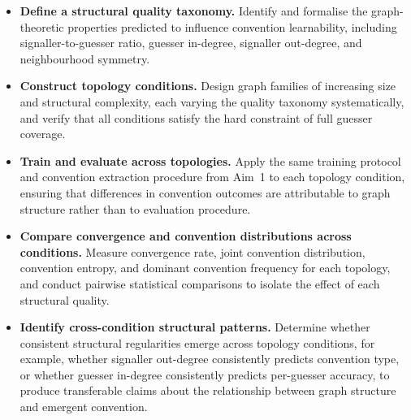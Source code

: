 \documentclass[a4paper,twoside,12pt]{report}
\begin{document}
    \begin{itemize}
        \item[\textbf{O2.1}] \textbf{Define a structural quality taxonomy.}
        Identify and formalise the graph-theoretic properties predicted to
        influence convention learnability, including signaller-to-guesser ratio,
        guesser in-degree, signaller out-degree, and neighbourhood symmetry.
    
        \item[\textbf{O2.2}] \textbf{Construct topology conditions.}
        Design graph families of increasing size and structural
        complexity, each varying the quality taxonomy systematically, and verify that all conditions satisfy the hard constraint of full guesser coverage.
    
        \item[\textbf{O2.3}] \textbf{Train and evaluate across topologies.}
        Apply the same training protocol and convention extraction procedure from
        Aim~1 to each topology condition, ensuring that differences in convention
        outcomes are attributable to graph structure rather than to evaluation
        procedure.
    
        \item[\textbf{O2.4}] \textbf{Compare convergence and convention
        distributions across conditions.}
        Measure convergence rate, joint convention distribution, convention
        entropy, and dominant convention frequency for each topology, and conduct
        pairwise statistical comparisons to isolate the effect of each structural
        quality.
    
        \item[\textbf{O2.5}] \textbf{Identify cross-condition structural
        patterns.}
        Determine whether consistent structural regularities emerge across
        topology conditions, for example, whether signaller out-degree
        consistently predicts convention type, or whether guesser in-degree
        consistently predicts per-guesser accuracy, to produce transferable
        claims about the relationship between graph structure and emergent
        convention.
    \end{itemize}
    
    
    
\end{document}
